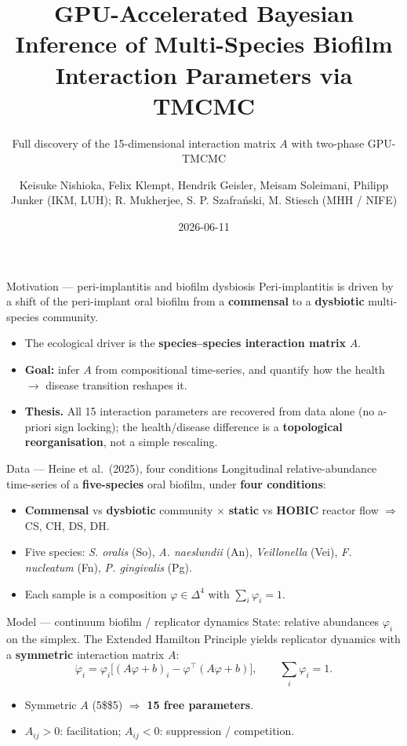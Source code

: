 \documentclass[
  ignorenonframetext,
  aspectratio=169,
  c]{beamer}
\title{GPU-Accelerated Bayesian Inference of Multi-Species Biofilm
Interaction Parameters via TMCMC}
\subtitle{Full discovery of the 15-dimensional interaction matrix \(A\)
with two-phase GPU-TMCMC}
\author{Keisuke Nishioka, Felix Klempt, Hendrik Geisler, Meisam
Soleimani, Philipp Junker (IKM, LUH); R. Mukherjee, S. P. Szafrański, M.
Stiesch (MHH / NIFE)}
\date{2026-06-11}
\providecommand{\tightlist}{%
  \setlength{\itemsep}{0pt}\setlength{\parskip}{0pt}}
\begin{document}
\frame{\titlepage}

\begin{frame}{Motivation --- peri-implantitis and biofilm dysbiosis}
\protect\hypertarget{motivation-peri-implantitis-and-biofilm-dysbiosis}{}
Peri-implantitis is driven by a shift of the peri-implant oral biofilm
from a \textbf{commensal} to a \textbf{dysbiotic} multi-species
community.

\begin{itemize}
\tightlist
\item
  The ecological driver is the \textbf{species--species interaction
  matrix} \(A\).
\item
  \textbf{Goal:} infer \(A\) from compositional time-series, and
  quantify how the health \(\to\) disease transition reshapes it.
\item
  \textbf{Thesis.} All 15 interaction parameters are recovered from data
  alone (no a-priori sign locking); the health/disease difference is a
  \textbf{topological reorganisation}, not a simple rescaling.
\end{itemize}
\end{frame}

\begin{frame}{Data --- Heine et al.~(2025), four conditions}
\protect\hypertarget{data-heine-et-al.-2025-four-conditions}{}
Longitudinal relative-abundance time-series of a \textbf{five-species}
oral biofilm, under \textbf{four conditions}:

\begin{itemize}
\tightlist
\item
  \textbf{Commensal} vs \textbf{dysbiotic} community \(\times\)
  \textbf{static} vs \textbf{HOBIC} reactor flow \(\Rightarrow\) CS, CH,
  DS, DH.
\item
  Five species: \emph{S. oralis} (So), \emph{A. naeslundii} (An),
  \emph{Veillonella} (Vei), \emph{F. nucleatum} (Fn), \emph{P.
  gingivalis} (Pg).
\item
  Each sample is a composition \(\varphi\in\Delta^{4}\) with
  \(\sum_i\varphi_i=1\).
\end{itemize}
\end{frame}

\begin{frame}{Model --- continuum biofilm / replicator dynamics}
\protect\hypertarget{model-continuum-biofilm-replicator-dynamics}{}
State: relative abundances \(\varphi_i\) on the simplex. The Extended
Hamilton Principle yields replicator dynamics with a \textbf{symmetric}
interaction matrix \(A\):
\[\dot{\varphi}_i = \varphi_i\Big[(A\varphi+b)_i - \varphi^{\!\top}(A\varphi+b)\Big],
\qquad \sum_i\varphi_i = 1 .\]

\begin{itemize}
\tightlist
\item
  Symmetric \(A\) (5\$\times\$5) \(\Rightarrow\) \textbf{15 free
  parameters}.
\item
  \(A_{ij}>0\): facilitation; \(A_{ij}<0\): suppression / competition.
\end{itemize}
\end{frame}
\end{document}
